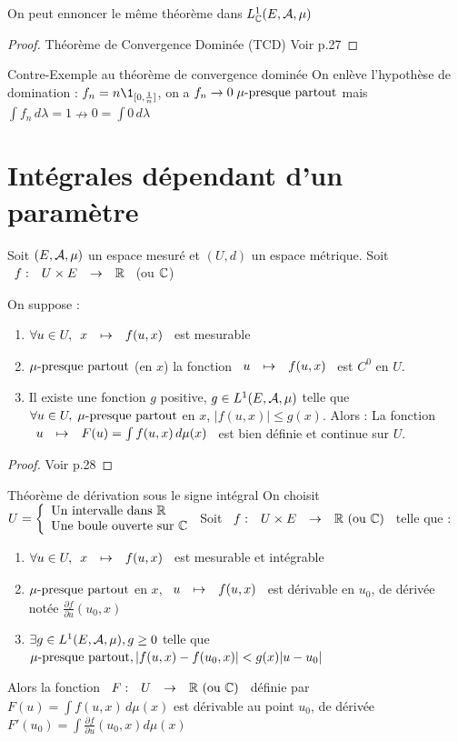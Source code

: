 \documentclass[]{report}
\begin{document}
\begin{re}{}{}
    On peut ennoncer le même théorème dans $L_{\mathbb{C}}^1(E,\mathcal{A},\mu)$
\end{re}

\begin{proof}{Théorème de Convergence Dominée (TCD)}{}
    Voir p.27
\end{proof}

\begin{ex}{Contre-Exemple au théorème de convergence dominée}{}
    On enlève l'hypothèse de domination :
    $f_n=n\1_{[0,\frac{1}{n}]}$, on a $f_n\to0\;\mu\text{-presque partout}$ mais $\int f_n \,d\lambda=1\nrightarrow0=\int 0\,d\lambda$
\end{ex}

\section{Intégrales dépendant d'un paramètre}

Soit $(E,\mathcal{A},\mu)$ un espace mesuré et $(U,d)$ un espace métrique. Soit $\begin{array}{ccccc} f : & U\times E & \to & \mathbb{R} \end{array}$ (ou $\mathbb{C}$)

\begin{tm}{}{}
    On suppose :
    \begin{enumerate}
        \item $\forall u\in U, \begin{array}{ccccc} x & \mapsto & f(u,x) \end{array}$ est mesurable
        \item $\mu\text{-presque partout}$ (en $x$) la fonction $\begin{array}{ccccc} u & \mapsto & f(u,x) \end{array}$ est $C^0$ en $U$.
        \item Il existe une fonction $g$ positive, $g\in L^1(E,\mathcal{A},\mu)$ telle que $\forall u\in U,\; \mu\text{-presque partout}$ en $x$, $|f(u,x)|\le g(x)$.
        Alors : La fonction $\begin{array}{ccccc} u & \mapsto & F(u)=\int f(u,x)\,d\mu(x) \end{array}$ est bien définie et continue sur $U$.
    \end{enumerate}
\end{tm}

\begin{proof}{}{}
    Voir p.28
\end{proof}

\begin{tm}{Théorème de dérivation sous le signe intégral}{}
    On choisit $U=\left\{\begin{array}{ll} \text{Un intervalle dans }\mathbb{R}\\\text{Une boule ouverte sur }\mathbb{C} \end{array} \right.$
    Soit $\begin{array}{ccccc} f : & U\times E & \to & \mathbb{R}\text{ (ou }\mathbb{C}\text{)} \end{array}$ telle que :
    \begin{enumerate}
        \item $\forall u \in U, \begin{array}{ccccc} x & \mapsto & f(u,x) \end{array}$ est mesurable et intégrable
        \item $\mu\text{-presque partout}$ en $x$, $\begin{array}{ccccc} u & \mapsto & f(u,x) \end{array}$ est dérivable en $u_0$, de dérivée notée $\frac{\partial f}{\partial u}(u_0,x)$
        \item $\exists g\in L^1(E,\mathcal{A},\mu),g\ge0$ telle que $\mu\text{-presque partout},|f(u,x)-f(u_0,x)|<g(x)|u-u_0|$
    \end{enumerate}
    Alors la fonction $\begin{array}{ccccc} F : & U & \to & \mathbb{R}\text{ (ou }\mathbb{C}) \end{array}$ définie par $F(u)=\int f(u,x)\,d\mu(x)$ est dérivable au point $u_0$, de dérivée $F'(u_0)=\int\frac{\partial f}{\partial u}(u_0,x)d\mu(x)$
\end{tm}
\end{document}
